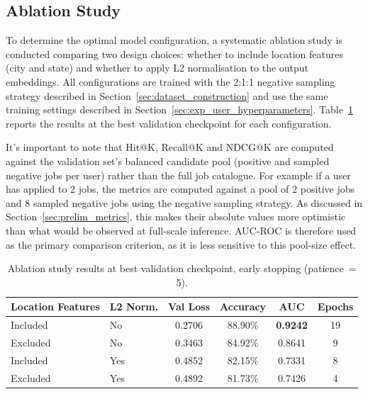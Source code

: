 \subsection{Ablation Study}
\label{sec:exp_user_ablation}
 
To determine the optimal model configuration, a systematic ablation study is conducted comparing two design choices: whether to include location features (city and state) and whether to apply L2 normalisation to the output embeddings. All configurations are trained with the 2:1:1 negative sampling strategy described in Section~\ref{sec:dataset_construction} and use the same training settings described in Section~\ref{sec:exp_user_hyperparameters}. Table~\ref{tab:ablation_user} reports the results at the best validation checkpoint for each configuration.
 
It's important to note that Hit@K, Recall@K and NDCG@K are computed against the validation set's balanced candidate pool (positive and sampled negative jobs per user) rather than the full job catalogue. For example if a user has applied to 2 jobs, the metrics are computed against a pool of 2 positive jobs and 8 sampled negative jobs using the negative sampling strategy. As discussed in Section~\ref{sec:prelim_metrics}, this makes their absolute values more optimistic than what would be observed at full-scale inference. \gls{AUC-ROC} is therefore used as the primary comparison criterion, as it is less sensitive to this pool-size effect. 
 
\begin{table}[htbp]
    \centering
    \caption{Ablation study results at best validation checkpoint, early stopping (patience~= 5).}
    \label{tab:ablation_user}
    \begin{tabular}{llcccc}
        \toprule
        \textbf{Location Features} & \textbf{L2 Norm.} & \textbf{Val Loss} & \textbf{Accuracy} & \textbf{AUC} & \textbf{Epochs} \\
        \midrule
        Included & No  & 0.2706 & 88.90\% & \textbf{0.9242} & 19 \\
        Excluded & No  & 0.3463 & 84.92\% & 0.8641 &  9 \\
        Included & Yes & 0.4852 & 82.15\% & 0.7331 &  8 \\
        Excluded & Yes & 0.4892 & 81.73\% & 0.7426 &  4 \\
        \bottomrule
    \end{tabular}
\end{table}
 
